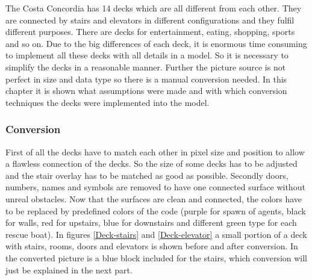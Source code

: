 \documentclass[11pt]{article}
\begin{document}
The Costa Concordia has 14 decks which are all different from each other. They are connected by stairs and elevators in different configurations and they fulfil different purposes. There are decks for entertainment, eating, shopping, sports and so on.
Due to the big differences of each deck, it is enormous time consuming to implement all these decks with all details in a model. So it is necessary to simplify the decks in a reasonable manner.
Further the picture source is not perfect in size and data type so there is a manual conversion needed.
In this chapter it is shown what assumptions were made and with which conversion techniques the decks were implemented into the model.

\subsubsection{Conversion}
First of all the decks have to match each other in pixel size and position to allow a flawless connection of the decks. So the size of some decks has to be adjusted and the stair overlay has to be matched as good as possible.
Secondly doors, numbers, names and symbols are removed to have one connected surface without unreal obstacles.
\newline
Now that the surfaces are clean and connected, the colors have to be replaced by predefined colors of the code (purple for spawn of agents, black for walls, red for upstairs, blue for downstairs and different green type for each rescue boat).
\newline
In figures \ref{Deck-stairs} and \ref{Deck-elevator} a small portion of a deck with stairs, rooms, doors and elevators is shown before and after conversion. In the converted picture is a blue block included for the stairs, which conversion will just be explained in the next part.
\end{document}

